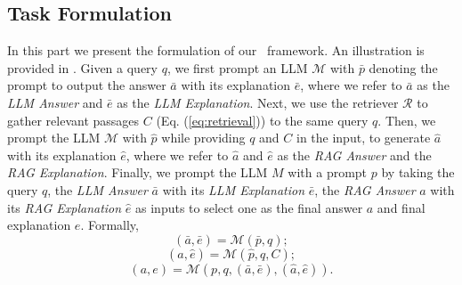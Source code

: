 \subsection{Task Formulation}

In this part we present the formulation of our \framework~framework.
An illustration is provided in . 
Given a query $q$, we first prompt an LLM $\mathcal{M}$ with $\bar{p}$ denoting the prompt to output the answer $\bar{a}$ with its explanation $\bar{e}$, where we refer to $\bar{a}$ as the \emph{LLM Answer} and $\bar{e}$ as the \emph{LLM Explanation}.
Next, we use the retriever $\mathcal{R}$ to gather relevant passages $C$ (Eq. (\ref{eq:retrieval})) to the same query $q$.
Then, we prompt the LLM $\mathcal{M}$ with $\hat{p}$ while providing $q$ and $C$ in the input, to generate $\hat{a}$ with its explanation $\hat{e}$, where we refer to  $\hat{a}$ and $\hat{e}$  as the \emph{RAG Answer} and the \emph{RAG Explanation}.
Finally, we prompt the LLM $M$ with a prompt $p$ by taking the query $q$, the \emph{LLM Answer} $\bar{a}$ with its \emph{LLM Explanation} $\bar{e}$, the \emph{RAG Answer} $\hat{a}$ with its \emph{RAG Explanation} $\hat{e}$ as inputs to select one as the final answer $a$ and final explanation $e$.
Formally,
\begin{equation}\label{eq:llm-ans-e}
(\bar{a}, \bar{e}) = \mathcal{M}(\bar{p}, q);
\end{equation}
\begin{equation}\label{eq:rag-ans-e}
(\hat{a}, \hat{e}) = \mathcal{M}(\hat{p}, q, C);
\end{equation}
\begin{equation}\label{eq:final-ans-e}
(a, e) = \mathcal{M}(p, q, (\bar{a}, \bar{e}), (\hat{a}, \hat{e})).
\end{equation}




